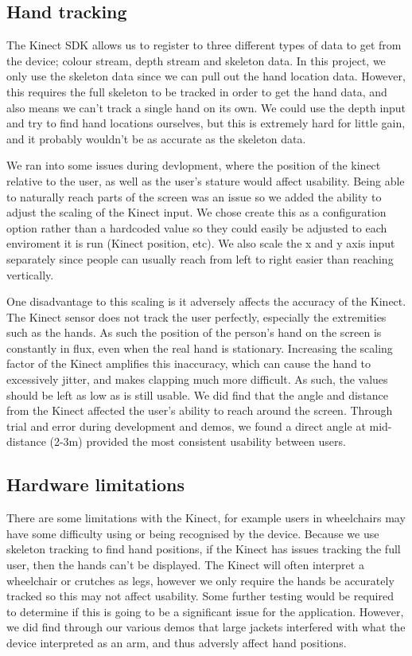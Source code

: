 \subsection{Hand tracking}
The Kinect SDK allows us to register to three different types of data to get from the device; colour stream, depth stream and skeleton data.
In this project, we only use the skeleton data since we can pull out the hand location data.
However, this requires the full skeleton to be tracked in order to get the hand data, and also means we can't track a single hand on its own.
We could use the depth input and try to find hand locations ourselves, but this is extremely hard for little gain, and it probably wouldn't be as accurate as the skeleton data.

We ran into some issues during devlopment, where the position of the kinect relative to the user, as well as the user's stature would affect usability.
Being able to naturally reach parts of the screen was an issue so we added the ability to adjust the scaling of the Kinect input.
We chose create this as a configuration option rather than a hardcoded value so they could easily be adjusted to each enviroment it is run (Kinect position, etc).
We also scale the x and y axis input separately since people can usually reach from left to right easier than reaching vertically.

One disadvantage to this scaling is it adversely affects the accuracy of the Kinect.
The Kinect sensor does not track the user perfectly, especially the extremities such as the hands.
As such the position of the person's hand on the screen is constantly in flux, even when the real hand is stationary.
Increasing the scaling factor of the Kinect amplifies this inaccuracy, which can cause the hand to excessively jitter, and makes clapping much more difficult.
As such, the values should be left as low as is still usable.
We did find that the angle and distance from the Kinect affected the user's ability to reach around the screen.
Through trial and error during development and demos, we found a direct angle at mid-distance (2-3m) provided the most consistent usability between users.

\subsection{Hardware limitations}
There are some limitations with the Kinect, for example users in wheelchairs may have some difficulty using or being recognised by the device.
Because we use skeleton tracking to find hand positions, if the Kinect has issues tracking the full user, then the hands can't be displayed.
The Kinect will often interpret a wheelchair or crutches as legs, however we only require the hands be accurately tracked so this may not affect usability.
Some further testing would be required to determine if this is going to be a significant issue for the application.
However, we did find through our various demos that large jackets interfered with what the device interpreted as an arm, and thus adversly affect hand positions.


